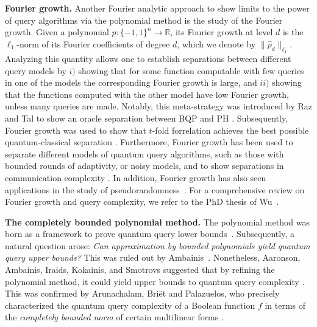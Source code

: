\documentclass[11pt]{article}
\newcommand{\norm}[1]{\|#1\|}
\newcommand{\R}{\mathbb{R}} %
\newcommand{\1}{\mathbf{1}}
\theoremstyle{plain}
\theoremstyle{definition}
\theoremstyle{remark}
\begin{document}
\vspace{0.3cm}
\noindent \textbf{Fourier growth.} Another Fourier analytic approach to show limits to the power of query algorithms via the polynomial method is the study of the Fourier growth. Given a polynomial $p:\{-1,1\}^n\to \R$, its Fourier growth at level $d$ is the $\ell_1$-norm of its Fourier coefficients of degree $d$, which we denote by $\norm{\widehat p_{d}}_{\ell_1}.$ Analyzing this quantity allows one to establish separations between different query models by $i)$ showing that for some function computable with few queries in one of the models the corresponding Fourier growth is large, and $ii)$ showing that the functions computed with the other model have low Fourier growth, unless many queries are made. Notably, this meta-strategy was introduced by Raz and Tal to show an oracle separation between BQP and PH \cite{raz2022oracle}. Subsequently, Fourier growth was used to show that $t$-fold forrelation achieves the best possible quantum-classical separation \cite{bansal2021k,girish2021fourier}. Furthermore, Fourier growth has been used to separate different models of quantum query algorithms, such as those with bounded rounds of adaptivity, or noisy models, and to show separations in communication complexity \cite{tal2020towards,girish2023fourier,girish2024power,girish2026fourier}. In addition, Fourier growth has also seen applications in the study of pseudorandomness~\cite{agrawal2020coin,chattopadhyay2018pseudorandom,chattopadhyay2019pseudorandom,chattopadhyay2020fractional}. For a comprehensive review on Fourier growth and query complexity, we refer to the PhD thesis of Wu~\cite{Wu:EECS-2025-39}.

\vspace{0.3cm}
\noindent\textbf{The completely bounded polynomial method.} The polynomial method was born as a framework to prove quantum query lower bounds~\cite{beals2001quantum}. Subsequently, a natural question arose: \emph{Can approximation by bounded polynomials yield quantum query upper bounds?} 
This was ruled out by Ambainis~\cite{Ambainis:2006}. Nonetheless, Aaronson, Ambainis, Iraids, Kokainis, and Smotrovs suggested that by refining the polynomial method, it could yield upper bounds to quantum query complexity \cite{Aaronson2015PolynomialsQQ}. This was confirmed by Arunachalam, Briët and Palazuelos, who precisely characterized the quantum query complexity of a Boolean function $f$ in terms of the \emph{completely bounded norm} of certain multilinear forms \cite{QQA=CBF}. 
\end{document}
